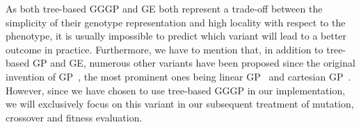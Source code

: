 As both tree-based GGGP and GE both represent a trade-off between the simplicity of their genotype representation and high locality with respect to the phenotype, it is usually impossible to predict which variant will lead to a better outcome in practice.
Furthermore, we have to mention that, in addition to tree-based GP and GE, numerous other variants have been proposed since the original invention of GP~\cite{poli2008field}, the most prominent ones being linear GP~\cite{brameier2007linear} and cartesian GP~\cite{miller2008cartesian}. 
However, since we have chosen to use tree-based GGGP in our implementation, we will exclusively focus on this variant in our subsequent treatment of mutation, crossover and fitness evaluation.

